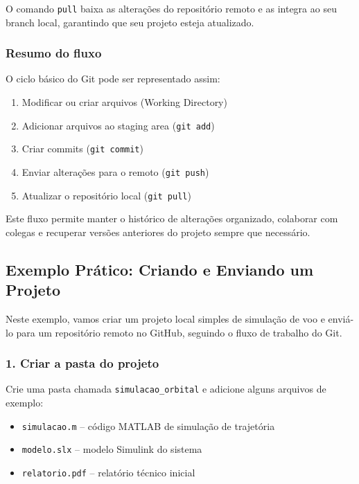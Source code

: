 O comando \texttt{pull} baixa as alterações do repositório remoto e as integra ao seu branch local, garantindo que seu projeto esteja atualizado.

\subsubsection*{Resumo do fluxo}

O ciclo básico do Git pode ser representado assim:

\begin{enumerate}
    \item Modificar ou criar arquivos (Working Directory)
    \item Adicionar arquivos ao staging area (\texttt{git add})
    \item Criar commits (\texttt{git commit})
    \item Enviar alterações para o remoto (\texttt{git push})
    \item Atualizar o repositório local (\texttt{git pull})
\end{enumerate}

Este fluxo permite manter o histórico de alterações organizado, colaborar com colegas e recuperar versões anteriores do projeto sempre que necessário.

\subsection{Exemplo Prático: Criando e Enviando um Projeto}

Neste exemplo, vamos criar um projeto local simples de simulação de voo e enviá-lo para um repositório remoto no GitHub, seguindo o fluxo de trabalho do Git.

\subsubsection*{1. Criar a pasta do projeto}

Crie uma pasta chamada \texttt{simulacao\_orbital} e adicione alguns arquivos de exemplo:

\begin{itemize}
    \item \texttt{simulacao.m} – código MATLAB de simulação de trajetória
    \item \texttt{modelo.slx} – modelo Simulink do sistema
    \item \texttt{relatorio.pdf} – relatório técnico inicial
\end{itemize}

